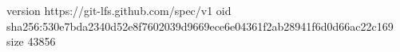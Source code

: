 version https://git-lfs.github.com/spec/v1
oid sha256:530e7bda2340d52e8f7602039d9669ece6e04361f2ab28941f6d0d66ac22c169
size 43856
